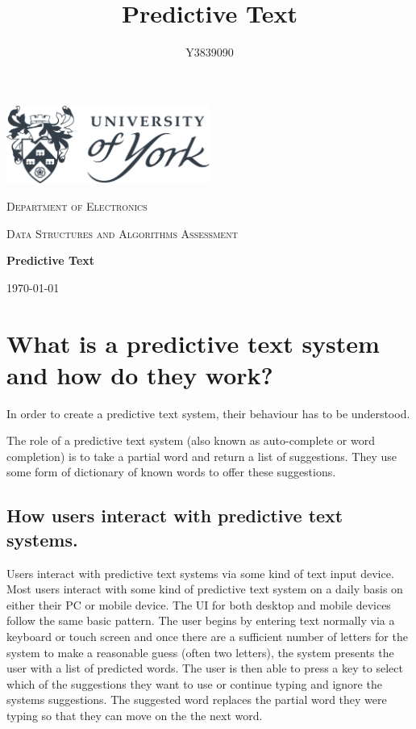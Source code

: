 \documentclass[10pt]{article} %
\title{
	Predictive Text
}
\author{Y3839090}
\begin{document}
    
	\begin{titlepage}
		\centering
		\includegraphics[width=0.5\textwidth]{UoY_logo}\par\vspace{1cm}
		{\scshape\LARGE Department of Electronics \par}
		\vspace{1cm}
		{\scshape\Large Data Structures and Algorithms Assessment \par}
		\vspace{2cm}
		{\huge\bfseries Predictive Text\par}

	
		\vfill
		{\Large\itshape \@author \par}
		\vspace{2cm}
		{\large \today\par}
	\end{titlepage}
	
	
	\tableofcontents
	\newpage
	
	
	\section{What is a predictive text system and how do they work?}
		In order to create a predictive text system, their behaviour has to be understood.
		
		The role of a predictive text system (also known as  auto-complete or word completion) is to take a partial word and return a list of suggestions. They use some form of dictionary of known words to offer these suggestions.
		\subsection{How users interact with predictive text systems.}
			Users interact with predictive text systems via some kind of text input device. Most users interact with some kind of predictive text system on a daily basis on either their PC or mobile device. The UI for both desktop and mobile devices follow the same basic pattern. The user begins by entering text normally via a keyboard or touch screen and once there are a sufficient number of letters for the system to make a reasonable guess (often two letters), the system presents the user with a list of predicted words. The user is then able to press a key to select which of the suggestions they want to use or continue typing and ignore the systems suggestions. The suggested word replaces the partial word they were typing so that they can move on the the next word.
\end{document}
